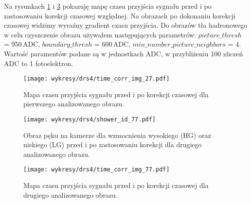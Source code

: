 \documentclass[a4paper,11pt,twoside]{article}
\begin{document}
Na rysunkach \ref{fig:map_time_27} i \ref{fig:map_time_corr_77} pokazuję mapę czasu przyjścia sygnału przed i po zastosowaniu korekcji czasowej względnej. Na obrazach po dokonaniu korekcji czasowej widzimy wyraźny gradient czasu przyjścia. Do obrazów tła hadronowego w celu czyszczenie obrazu używałem następujących parametrów: $picture\_thresh$ = 950\,ADC, $boundary\_thresh$ = 600\,ADC, $min\_number\_picture\_neighbors$ = 4. \\
Wartość paramentów podane są w jednostkach ADC, w przybliżeniu 100 zliczeń ADC to 1 fotoelektron. 
\begin{figure}[H] 
\centering
\texttt{[image: wykresy/drs4/time\_corr\_img\_27.pdf]}
\caption{Mapa czasu przyjścia sygnału przed i po korekcji czasowej dla pierwszego analizowanego obrazu.}
\label{fig:map_time_27}
\end{figure}
\newpage
\begin{figure}[H] 
\centering
\texttt{[image: wykresy/drs4/shower\_id\_77.pdf]}
\caption{Obraz pęku na kamerze dla wzmocnienia wysokiego (HG) oraz niskiego (LG) przed i po zastosowaniu korekcji dla drugiego analizowanego obrazu.}
\label{fig:image_77}
\end{figure}
 
\begin{figure}[H] 
\centering
\texttt{[image: wykresy/drs4/time\_corr\_img\_77.pdf]}
\caption{Mapa czasu przyjścia sygnału przed i po korekcji czasowej dla drugiego analizowanego obrazu.}
\label{fig:map_time_corr_77}
\end{figure}
\end{document}
